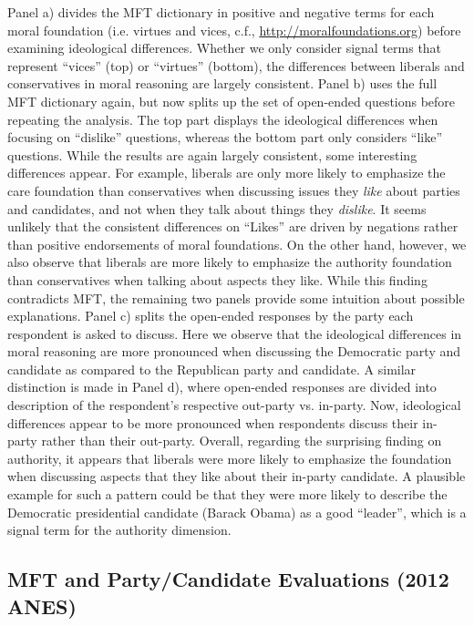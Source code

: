 \documentclass[12pt]{article}
\begin{document}
Panel a) divides the MFT dictionary in positive and negative terms for each moral foundation (i.e. virtues and vices, c.f., \url{http://moralfoundations.org}) before examining ideological differences. Whether we only consider signal terms that represent ``vices'' (top) or ``virtues'' (bottom), the differences between liberals and conservatives in moral reasoning are largely consistent. Panel b) uses the full MFT dictionary again, but now splits up the set of open-ended questions before repeating the analysis. The top part displays the ideological differences when focusing on ``dislike'' questions, whereas the bottom part only considers ``like'' questions. While the results are again largely consistent, some interesting differences appear. For example, liberals are only more likely to emphasize the care foundation than conservatives when discussing issues they \textit{like} about parties and candidates, and not when they talk about things they \textit{dislike}. It seems unlikely that the consistent differences on ``Likes'' are driven by negations rather than positive endorsements of moral foundations. On the other hand, however, we also observe that liberals are more likely to emphasize the authority foundation than conservatives when talking about aspects they like. While this finding contradicts MFT, the remaining two panels provide some intuition about possible explanations. Panel c) splits the open-ended responses by the party each respondent is asked to discuss. Here we observe that the ideological differences in moral reasoning are more pronounced when discussing the Democratic party and candidate as compared to the Republican party and candidate. A similar distinction is made in Panel d), where open-ended responses are divided into description of the respondent's respective out-party vs. in-party. Now, ideological differences appear to be more pronounced when respondents discuss their in-party rather than their out-party. Overall, regarding the surprising finding on authority, it appears that liberals were more likely to emphasize the foundation when discussing aspects that they like about their in-party candidate. A plausible example for such a pattern could be that they were more likely to describe the Democratic presidential candidate (Barack Obama) as a good ``leader'', which is a signal term for the authority dimension.


\clearpage
\subsection{MFT and Party/Candidate Evaluations (2012 ANES)}
\end{document}
